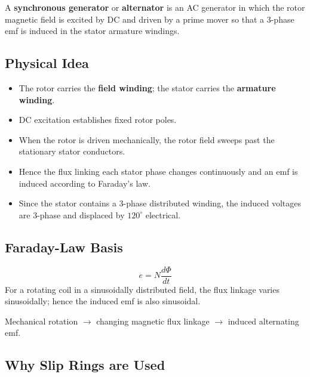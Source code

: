 \documentclass[12pt,a4paper]{article}
\newcommand{\degr}{^\circ}
\begin{document}
\begin{definebox}
A \textbf{synchronous generator} or \textbf{alternator} is an AC generator in which the rotor
magnetic field is excited by DC and driven by a prime mover so that a 3-phase emf is induced in
the stator armature windings.
\end{definebox}

\subsection{Physical Idea}

\begin{itemize}[leftmargin=*]
  \item The rotor carries the \textbf{field winding}; the stator carries the \textbf{armature winding}.
  \item DC excitation establishes fixed rotor poles.
  \item When the rotor is driven mechanically, the rotor field sweeps past the stationary stator conductors.
  \item Hence the flux linking each stator phase changes continuously and an emf is induced according to Faraday's law.
  \item Since the stator contains a 3-phase distributed winding, the induced voltages are 3-phase and displaced by $120\degr$ electrical.
\end{itemize}

\subsection{Faraday-Law Basis}

\begin{formulabox}
\[
  e = N\frac{d\Phi}{dt}
\]
For a rotating coil in a sinusoidally distributed field, the flux linkage varies sinusoidally; hence the induced emf is also sinusoidal.
\end{formulabox}

\begin{importantbox}
Mechanical rotation \(\rightarrow\) changing magnetic flux linkage \(\rightarrow\) induced alternating emf.
\end{importantbox}

\subsection{Why Slip Rings are Used}
\end{document}
